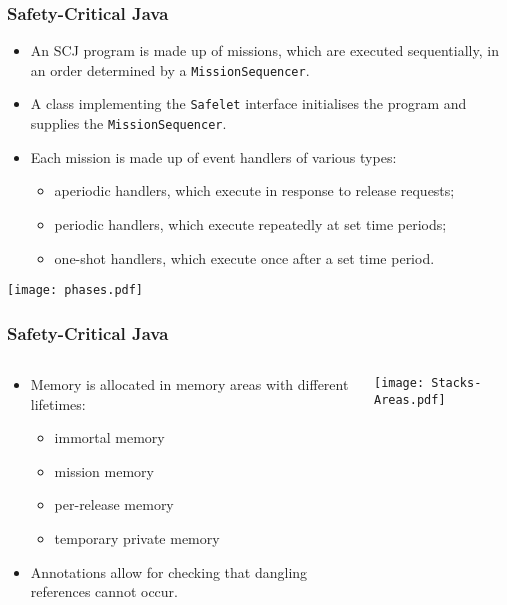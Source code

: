 \documentclass{beamer}
\begin{document}
\begin{frame}
  \frametitle{Safety-Critical Java}
  \begin{itemize}
  \item An SCJ program is made up of missions, which are executed sequentially, in an order determined by a \texttt{MissionSequencer}.
  \item A class implementing the \texttt{Safelet} interface initialises the program and supplies the \texttt{MissionSequencer}.
  \item Each mission is made up of event handlers of various types:
    \begin{itemize}
      \item aperiodic handlers, which execute in response to release
        requests;
      \item periodic handlers, which execute repeatedly at set
        time periods;
      \item one-shot handlers, which execute once after a set time period.
      \end{itemize}
  \end{itemize}
  \texttt{[image: phases.pdf]}
\end{frame}

\begin{frame}
  \frametitle{Safety-Critical Java}
  \begin{columns}
    \begin{column}{.5\textwidth}
      \begin{itemize}
      \item Memory is allocated in memory areas with different lifetimes:
        \begin{itemize}
        \item immortal memory
        \item mission memory
        \item per-release memory
        \item temporary private memory
        \end{itemize}
      \item Annotations allow for checking that dangling references cannot occur.
      \end{itemize}
    \end{column}
    \begin{column}{.5\textwidth}
      \texttt{[image: Stacks-Areas.pdf]}
    \end{column}
  \end{columns}
\end{frame}
  
\end{document}
